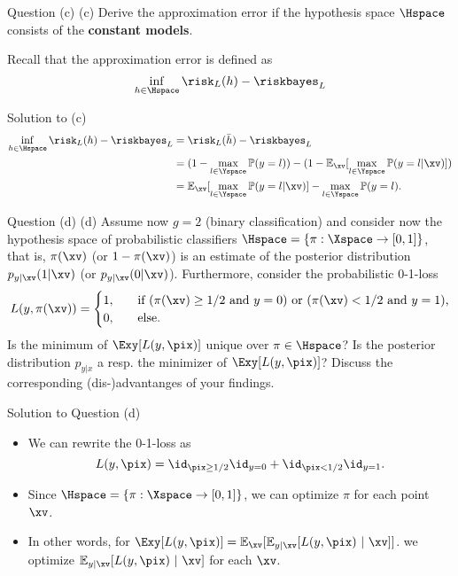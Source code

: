 \documentclass[aspectratio=169]{beamer}
\newcommand{\Ex}{\mathbb{E}_{\xv}}
\newcommand{\Eyx}{\mathbb{E}_{y|\xv}}
\newcommand{\Prob}{\mathbb{P}}
\begin{document}
\begin{frame}{Question (c)}
	(c) Derive the approximation error if the hypothesis space $\Hspace$ consists of the \textbf{constant models}.
	\vspace{10pt}
	
	Recall that the approximation error is defined as 
	$$\inf_{h \in \Hspace} \risk_L(h) - \riskbayes_L$$
\end{frame}

\begin{frame}{Solution to (c)}
	\begin{align*}
		\inf_{h \in \Hspace} \risk_L(h) - \riskbayes_L 
		&= \risk_L(\bar{h}) - \riskbayes_L \\
		&= (1 - \max_{l \in \Yspace} \Prob(y=l)) - (1 - \Ex[\max_{l \in \Yspace} \Prob(y = l | \xv)]) \\
		&= \Ex[\max_{l \in \Yspace} \Prob(y = l | \xv)] - \max_{l \in \Yspace} \Prob(y=l).
	\end{align*}
\end{frame}

\begin{frame}{Question (d)}
	(d) Assume now $g=2$ (binary classification) and consider now the hypothesis space of probabilistic classifiers $\Hspace = \{\pi: \Xspace \to [0, 1] \}$, that is, $\pi(\xv)$ (or $1 - \pi(\xv)$) is an estimate of the posterior distribution $p_{y | \xv} (1 | \xv)$ (or $p_{y | \xv} (0 | \xv)$). Furthermore, consider the probabilistic 0-1-loss
	$$
	L(y, \pi(\xv)) = \begin{cases}
		1, \quad & \text{if ($\pi(\xv) \geq 1/2$ and $y=0$) or ($\pi(\xv) < 1/ 2$ and $y = 1$),} \\
		0, \quad & \text{else.}
	\end{cases}
	$$
	Is the minimum of $\Exy[L(y, \pix)]$ unique over $\pi \in \Hspace$? Is the posterior distribution $p_{y|x}$ a resp. the minimizer of $\Exy[L(y, \pix)]$? Discuss the corresponding (dis-)advantanges of your findings.
\end{frame}

\begin{frame}{Solution to Question (d)}
	\begin{itemize}
		\item We can rewrite the 0-1-loss as $$L(y, \pix) = \id_{\pix \geq 1/2} \id_{y=0} + \id_{\pix <1/2} \id_{y=1}.$$
		\item Since $\Hspace = \{\pi: \Xspace \to [0, 1] \}$, we can optimize $\pi$ for each point $\xv$.
		\item In other words, for $\Exy[L(y, \pix)] = \Ex[\Eyx[L(y, \pix) \ | \ \xv]]$. we optimize $\Eyx[L(y, \pix) \ | \ \xv]$ for each $\xv$.
	\end{itemize}

\end{frame}
\end{document}
